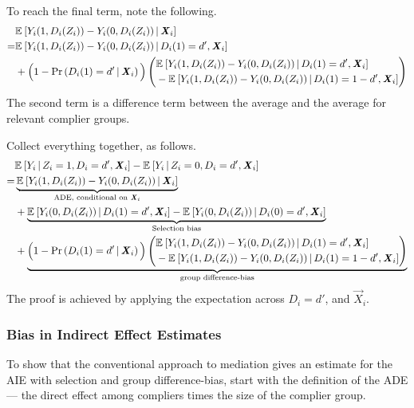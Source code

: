 To reach the final term, note the following.
\begin{align*}
    &\mathbb{E}_{} \left[ Y_i(1, D_i(Z_i)) - Y_i(0, D_i(Z_i)) \, \middle\vert \, \boldsymbol{\mathit{X}}_i \right] \\    
    =& \mathbb{E}_{} \left[ Y_i(1, D_i(Z_i)) - Y_i(0, D_i(Z_i)) \, \middle\vert \, D_i(1) = d', \boldsymbol{\mathit{X}}_i \right] \\
    &+ \Big(1 - \Pr\left( D_i(1) = d' \, \middle\vert \, \boldsymbol{\mathit{X}}_i \right)\Big)
    \left( \begin{aligned}
        &\mathbb{E}_{} \left[ Y_i(1, D_i(Z_i)) - Y_i(0, D_i(Z_i)) \, \middle\vert \, D_i(1) = d', \boldsymbol{\mathit{X}}_i \right] \\ 
        & - \mathbb{E}_{} \left[ Y_i(1, D_i(Z_i)) - Y_i(0, D_i(Z_i)) \, \middle\vert \, D_i(1) = 1 - d', \boldsymbol{\mathit{X}}_i \right]
    \end{aligned} \right) 
\end{align*}
The second term is a difference term between the average and the average for relevant complier groups.

Collect everything together, as follows.
\begin{align*}
    &  \mathbb{E}_{} \left[ Y_i \, \middle\vert \, Z_i = 1, D_i = d', \boldsymbol{\mathit{X}}_i \right]
    - \mathbb{E}_{} \left[ Y_i \, \middle\vert \, Z_i = 0, D_i = d', \boldsymbol{\mathit{X}}_i \right] \\
    =& \underbrace{
        \mathbb{E}_{} \left[ Y_i(1, D_i(Z_i)) - Y_i(0, D_i(Z_i)) \, \middle\vert \, \boldsymbol{\mathit{X}}_i \right]}_{
            \text{ADE, conditional on }\boldsymbol{\mathit{X}}_i} \\
    &+ \underbrace{
        \mathbb{E}_{} \left[ Y_i(0, D_i(Z_i)) \, \middle\vert \, D_i(1) = d', \boldsymbol{\mathit{X}}_i \right]
            - \mathbb{E}_{} \left[ Y_i(0, D_i(Z_i)) \, \middle\vert \, D_i(0) = d', \boldsymbol{\mathit{X}}_i \right]}_{
                \text{Selection bias}} \\
    &+ \underbrace{\Big(1 - \Pr\left( D_i(1) = d' \, \middle\vert \, \boldsymbol{\mathit{X}}_i \right)\Big)
    \left( \begin{aligned}
        &\mathbb{E}_{} \left[ Y_i(1, D_i(Z_i)) - Y_i(0, D_i(Z_i)) \, \middle\vert \, D_i(1) = d', \boldsymbol{\mathit{X}}_i \right] \\ 
        & - \mathbb{E}_{} \left[ Y_i(1, D_i(Z_i)) - Y_i(0, D_i(Z_i)) \, \middle\vert \, D_i(1) = 1 - d', \boldsymbol{\mathit{X}}_i \right]
    \end{aligned} \right)}_{
        \text{group difference-bias}}
\end{align*}
The proof is achieved by applying the expectation across $D_i = d'$, and $\vec X_i$.

\subsubsection{Bias in Indirect Effect Estimates}
To show that the conventional approach to mediation gives an estimate for the AIE with selection and group difference-bias, start with the definition of the ADE --- the direct effect among compliers times the size of the complier group.

